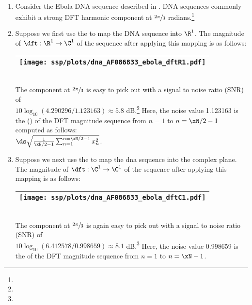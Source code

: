 \begin{example}
\label{ex:dftebola}
\mbox{}\\
\begin{enumerate}
  \item \label{item:dftebola_psp}
     Consider the Ebola DNA sequence described in .
     DNA sequences commonly exhibit a strong DFT harmonic component at $\sfrac{2\pi}{3}$ 
     radians.\footnote{}
  
  \item \label{item:dftebola_R1pam}
    Suppose we first use the   to map
    the DNA sequence into $\R^1$.
    The magnitude of $\dft:\R^1\to\C^1$ of the sequence after applying this mapping is as follows:
    \\\begin{tabular}{|>{\scs}c|}
         \hline
         \texttt{[image: ssp/plots/dna\_AF086833\_ebola\_dftR1.pdf]}%
       \\\hline
    \end{tabular}\\
    The component at $\sfrac{2\pi}{3}$ is easy to pick out with a signal to noise ratio (SNR) of\\ 
    $10\log_{10}(4.290296/1.123163)\approx5.8$ dB.\footnote{}
    Here, the noise value 1.123163 is the  () of the DFT magnitude 
    sequence from $n=1$ to $n=\xN/2-1$ computed as follows:
    \\\indentx$\ds\sqrt{\frac{1}{\xN/2-1}\sum_{n=1}^{n=\xN/2-1} x_n^2}$.
     
  \item \label{item:dftebola_C1qpsk}
    Suppose we next use the   to map
    the dna sequence into the complex plane.
    The magnitude of $\dft:\C^1\to\C^1$ of the sequence after applying this mapping is as follows:
     \\\begin{tabular}{|>{\scs}c|}
          \hline
          \texttt{[image: ssp/plots/dna\_AF086833\_ebola\_dftC1.pdf]}%
        \\\hline
     \end{tabular}\\
    The component at $\sfrac{2\pi}{3}$ is again easy to pick out with a signal to noise ratio (SNR) of\\
    $10\log_{10}(6.412578/0.998659)\approx8.1$ dB.\footnote{}
    Here, the noise value 0.998659 is the  of the DFT magnitude 
    sequence from $n=1$ to $n=\xN-1$.


\end{enumerate}
\end{example}
